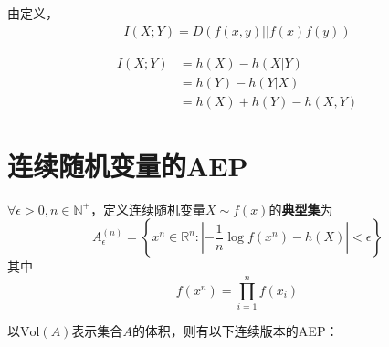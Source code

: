\documentclass{ctexbook}
\begin{document}
由定义，\begin{align*}
    I(X;Y)=D(f(x,y)||f(x)f(y))
\end{align*}

\begin{align*}
    I(X;Y)&=h(X)-h(X|Y)\\
    &=h(Y)-h(Y|X)\\
    &=h(X)+h(Y)-h(X,Y)
\end{align*}

\section{连续随机变量的AEP}

\begin{definition}[典型集]
    $\forall \epsilon>0,n\in\mathbb{N}^+$，定义连续随机变量$X\sim f(x)$的\textbf{典型集}为
    $$A^{(n)}_{\epsilon}=\left\{x^n\in \mathbb{R} ^n:\left|-\frac{1}{n}\log f(x^n)-h(X)\right|<\epsilon\right\}$$
    其中$$f(x^n)=\prod_{i=1}^n f(x_i)$$
\end{definition}

以$\text{Vol}(A)$表示集合$A$的体积，则有以下连续版本的AEP：
\end{document}

